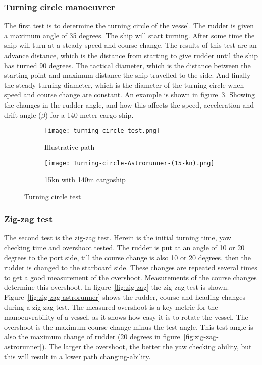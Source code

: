 \subsubsection{Turning circle manoeuvrer}
The first test is to determine the turning circle of the vessel. The rudder is given a maximum angle of 35 degrees. The ship will start turning. After some time the ship will turn at a steady speed and course change. The results of this test are an advance distance, which is the distance from starting to give rudder until the ship has turned 90 degrees. The tactical diameter, which is the distance between the starting point and maximum distance the ship travelled to the side. And finally the steady turning diameter, which is the diameter of the turning circle when speed and course change are constant. An example is shown in figure~\ref{fig:turning-circle}. Showing the changes in the rudder angle, and how this affects the speed, acceleration and drift angle ($\beta$) for a 140-meter cargo-ship.

\begin{figure}[p]
	\begin{subfigure}[b]{0.43\linewidth}
		\centering
		\texttt{[image: turning-circle-test.png]}
		\caption{Illustrative path}
		\label{fig:turning-circle-path}
	\end{subfigure} 
	\begin{subfigure}[b]{0.56\linewidth}
		\centering
		\texttt{[image: Turning-circle-Astrorunner-(15-kn).png]}
		\caption{15kn with 140m cargoship}
		\label{fig:turning-circle-astrorunner}
	\end{subfigure}
	\caption{Turning circle test}
	\label{fig:turning-circle} 
\end{figure}

\subsubsection{Zig-zag test}
The second test is the zig-zag test. Herein is the initial turning time, yaw checking time and overshoot tested. The rudder is put at an angle of 10 or 20 degrees to the port side, till the course change is also 10 or 20 degrees, then the rudder is changed to the starboard side. These changes are repeated several times to get a good measurement of the overshoot. Measurements of the course changes determine this overshoot. In figure~\ref{fig:zig-zag} the zig-zag test is shown. Figure~\ref{fig:zig-zag-astrorunner} shows the rudder, course and heading changes during a zig-zag test. The measured overshoot is a key metric for the manoeuvrability of a vessel, as it shows how easy it is to rotate the vessel. The overshoot is the maximum course change minus the test angle. This test angle is also the maximum change of rudder (20 degrees in figure~\ref{fig:zig-zag-astrorunner}). The larger the overshoot, the better the yaw checking ability, but this will result in a lower path changing-ability.


